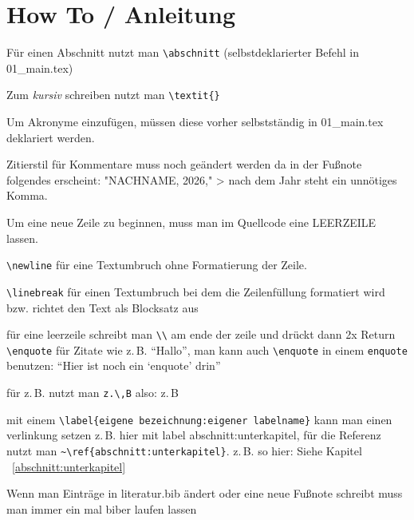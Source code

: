 \chapter{How To / Anleitung}

Für einen Abschnitt nutzt man \verb|\abschnitt| (selbstdeklarierter Befehl in 01\_main.tex)


Zum \textit{kursiv} schreiben nutzt man \verb|\textit{}|
\newline

Um Akronyme einzufügen, müssen diese vorher selbstständig in 01\_main.tex deklariert werden.
\newline

Zitierstil für Kommentare muss noch geändert werden da in der Fußnote folgendes erscheint: "NACHNAME, 2026," > nach dem Jahr steht ein unnötiges Komma.
\newline

Um eine neue Zeile zu beginnen, muss man im Quellcode eine LEERZEILE lassen.
\newline

\verb|\newline| für eine Textumbruch ohne Formatierung der Zeile.
\newline

\verb|\linebreak| für einen Textumbruch bei dem die Zeilenfüllung formatiert wird bzw. richtet den Text als Blocksatz aus
\newline

für eine leerzeile schreibt man \verb|\\| am ende der zeile und drückt dann 2x Return
\verb|\enquote| für Zitate wie z.\,B. \enquote{Hallo}, man kann auch \verb|\enquote| in einem \verb|enquote| benutzen: \enquote{Hier ist noch ein \enquote{enquote} drin}
\newline

für z.\,B. nutzt man \verb|z.\,B| also: z.\,B
\newline

mit einem \verb|\label{eigene bezeichnung:eigener labelname}| kann man einen verlinkung setzen z.\,B. hier mit label abschnitt:unterkapitel, für die Referenz nutzt man \linebreak \verb|~\ref{abschnitt:unterkapitel}|. z.\,B. so hier: Siehe Kapitel ~\ref{abschnitt:unterkapitel}
\newline

Wenn man Einträge in literatur.bib ändert oder eine neue Fußnote schreibt muss man immer ein mal biber laufen lassen
\newline


